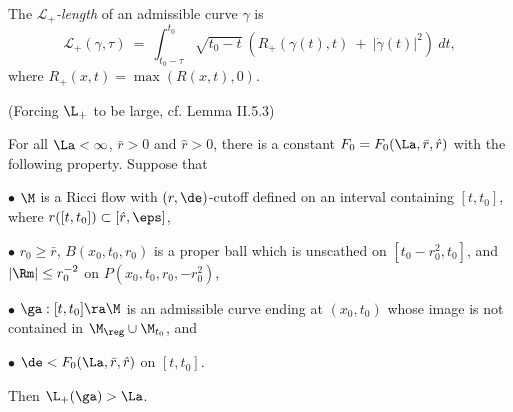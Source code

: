\begin{definition}
  \label{def:kl-establishing-noncollapsing-presence-surgery-noncollapsing-definition}

The {\em ${\mathcal L}_+$-length} of an admissible curve $\gamma$ is
\begin{equation}
{\mathcal L}_+(\gamma, \tau) \: = \:
\int_{t_0 - \tau}^{t_0} \sqrt{t_0 - t} \: \left(
R_+(\gamma(t), t) \: + \: |\dot{\gamma}(t)|^2 \right) \: dt,
\end{equation}
where $R_+(x,t) = \max(R(x,t), 0)$.
\end{definition}

\begin{lemma}
  \label{lem:kl-establishing-noncollapsing-presence-surgery-existence-noncollapsing}
(Forcing $\L_+$ to be large, cf. Lemma II.5.3)
\label{lplusbig}

For all $\La< \infty$, $\bar r>0$ and $\hat r>0$,
there is  a constant  $F_0=F_0(\La,\bar r,\hat r)$
with the following property.  Suppose that

$\bullet$  $\M$ is a Ricci flow  with $(r,\de)$-cutoff
defined on an interval containing $[t,t_0]$, where
 $r([t,t_0])\subset [\hat r,\eps]$,

$\bullet$ $r_0\geq \bar r$,
 $B(x_0,t_0,r_0)$ is a proper ball which is unscathed on $[t_0-r_0^2,t_0]$, and
$|\Rm|\leq r_0^{-2}$ on $P(x_0,t_0,r_0,-r_0^2)$,

$\bullet$ $\ga:[t,t_0]\ra\M$ is an admissible curve
ending at $(x_0, t_0)$
whose image
is not contained in $\M_{\reg}\cup\M_{t_0}$, and

$\bullet$ $\de < F_0(\La,\bar r,\hat r)$
on $[t,t_0]$.

\noindent
Then $\L_+(\ga)>\La$.
\end{lemma}

